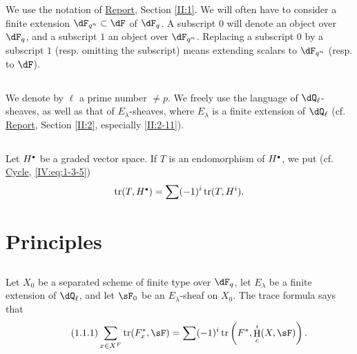 \documentclass[oneside]{book}
\DeclareMathOperator{\h}{H}
\DeclareMathOperator{\tr}{tr}
\theoremstyle{sga-source}
\theoremstyle{sga-source-dash}
\theoremstyle{sga-source-dotdash}
\theoremstyle{sga-source-number-note-dash}
\theoremstyle{sga-source-note-number-dotdash}
\theoremstyle{sga-source-example-dotdash}
\theoremstyle{sga-source-inline-number}
\theoremstyle{sga-source-bare-number}
\theoremstyle{sga-source}
\let\oldbullet\bullet
\renewcommand{\bullet}{\textnormal{\tiny$\oldbullet$}}
\begin{document}
We use the notation of \hyperref[II]{Report}, Section \ref{II:1}. We 
will often have to consider a finite extension $\dF_{q^n}\subset \dF$ of 
$\dF_q$. A subscript $0$ will denote an object over $\dF_q$, and a subscript $1$ 
an object over $\dF_{q^n}$. Replacing a subscript $0$ by a subscript $1$ (resp. 
omitting the subscript) means extending scalars to $\dF_{q^n}$ (resp. 
to $\dF$).





\subsection{}\label{VI:0-2}

We denote by $\ell$ a prime number $\ne p$. We freely use the 
language of $\dQ_\ell$-sheaves, as well as that of $E_\lambda$-sheaves, 
where $E_\lambda$ is a finite extension of $\dQ_\ell$ (cf. \hyperref[II]{Report}, 
Section \ref{II:2}, especially \ref{II:2-11}). 





\subsection{}\label{VI:0-3}

Let $H^\bullet$ be a graded vector space. If $T$ is an endomorphism of 
$H^\bullet$, we put (cf. \hyperref[IV]{Cycle}, \ref{IV:eq:1-3-5}) 
\[
  \tr(T,H^\bullet) = \sum (-1)^i \tr(T,H^i) \text{.}
\]










\section{Principles}\label{VI:1}





\subsection{}\label{VI:1-1}

Let $X_0$ be a separated scheme of finite type over $\dF_q$, let $E_\lambda$ be a 
finite extension of $\dQ_\ell$, and let $\sF_0$ be an $E_\lambda$-sheaf on $X_0$. The 
trace formula says that 
\begin{equation*}\tag{1.1.1}\label{VI:eq:1-1-1}
  \sum_{x\in X^F} \tr(F_x^\ast,\sF) = \sum (-1)^i \tr\left(F^\ast,\h_c^i(X,\sF)\right) \text{.}
\end{equation*}
\end{document}
